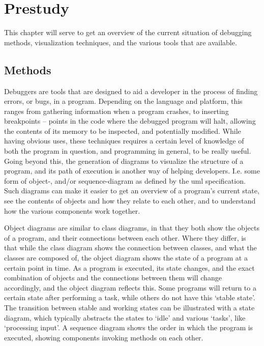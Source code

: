 \chapter{Prestudy}\label{prestudy}%

This chapter will serve to get an overview of the current situation of debugging methods, visualization techniques, and the various tools that are available.

\section{Methods}\label{preMethods}

Debuggers are tools that are designed to aid a developer in the process of finding errors, or bugs, in a program.
Depending on the language and platform, this ranges from gathering information when a program crashes, to inserting \glspl{breakpoint} -- points in the code where the debugged program will halt, allowing the contents of its memory to be inspected, and potentially modified.
While having obvious uses, these techniques requires a certain level of knowledge of both the program in question, and programming in general, to be really useful.
Going beyond this, the generation of diagrams to visualize the structure of a program, and its path of execution is another way of helping developers.
I.e. some form of object-, and/or sequence-diagram as defined by the \gls{uml} specification.
Such diagrams can make it easier to get an overview of a program's current state, see the contents of objects and how they relate to each other, and to understand how the various components work together.

Object diagrams are similar to class diagrams, in that they both show the objects of a program, and their connections between each other.
Where they differ, is that while the class diagram shows the connection between classes, and what the classes are composed of, the object diagram shows the state of a program at a certain point in time.
As a program is executed, its state changes, and the exact combination of objects and the connections between them will change accordingly, and the object diagram reflects this.
Some programs will return to a certain state after performing a task, while others do not have this `stable state'.
The transition between stable and working states can be illustrated with a state diagram, which typically abstracts the states to `idle' and various `tasks', like `processing input'.
A sequence diagram shows the order in which the program is executed, showing components invoking methods on each other.

